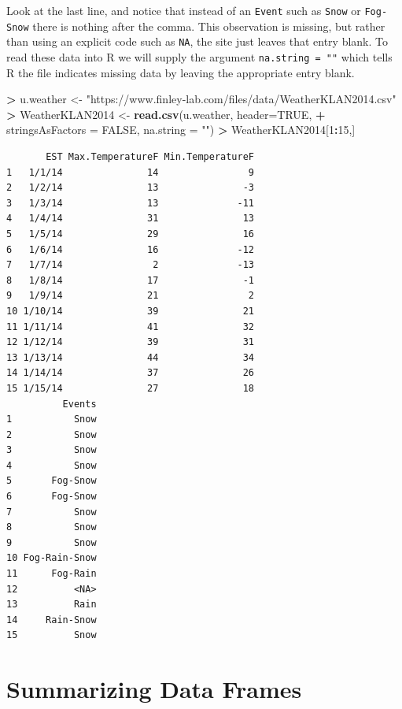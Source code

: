 \documentclass[
]{krantz}
\makeatletter
\newenvironment{Shaded}{\begin{snugshade}}{\end{snugshade}}
\newcommand{\DataTypeTok}[1]{\textcolor[rgb]{0.27,0.27,0.27}{#1}}
\newcommand{\DecValTok}[1]{\textcolor[rgb]{0.06,0.06,0.06}{#1}}
\newcommand{\KeywordTok}[1]{\textcolor[rgb]{0.27,0.27,0.27}{\textbf{#1}}}
\newcommand{\NormalTok}[1]{#1}
\newcommand{\OperatorTok}[1]{\textcolor[rgb]{0.43,0.43,0.43}{\textbf{#1}}}
\newcommand{\OtherTok}[1]{\textcolor[rgb]{0.37,0.37,0.37}{#1}}
\newcommand{\StringTok}[1]{\textcolor[rgb]{0.5,0.5,0.5}{#1}}
\newenvironment{kframe}{%
\medskip{}
\setlength{\fboxsep}{.8em}
 \def\at@end@of@kframe{}%
 \ifinner\ifhmode%
  \def\at@end@of@kframe{\end{minipage}}%
  \begin{minipage}{\columnwidth}%
 \fi\fi%
 \def\FrameCommand##1{\hskip\@totalleftmargin \hskip-\fboxsep
 \colorbox{shadecolor}{##1}\hskip-\fboxsep
     \hskip-\linewidth \hskip-\@totalleftmargin \hskip\columnwidth}%
 \MakeFramed {\advance\hsize-\width
   \@totalleftmargin\z@ \linewidth\hsize
   \@setminipage}}%
 {\par\unskip\endMakeFramed%
 \at@end@of@kframe}
\renewenvironment{Shaded}{\begin{kframe}}{\end{kframe}}
\makeatother
\begin{document}
Look at the last line, and notice that instead of an \texttt{Event} such as \texttt{Snow} or \texttt{Fog-Snow} there is nothing after the comma. This observation is missing, but rather than using an explicit code such as \texttt{NA}, the site just leaves that entry blank. To read these data into R we will supply the argument \texttt{na.string\ =\ ""} which tells R the file indicates missing data by leaving the appropriate entry blank.

\begin{Shaded}
\begin{Highlighting}[]
\OperatorTok{\textgreater{}}\StringTok{ }\NormalTok{u.weather \textless{}{-}}\StringTok{ "https://www.finley{-}lab.com/files/data/WeatherKLAN2014.csv"}
\OperatorTok{\textgreater{}}\StringTok{ }\NormalTok{WeatherKLAN2014 \textless{}{-}}\StringTok{ }\KeywordTok{read.csv}\NormalTok{(u.weather, }\DataTypeTok{header=}\OtherTok{TRUE}\NormalTok{, }
\OperatorTok{+}\StringTok{                             }\DataTypeTok{stringsAsFactors =} \OtherTok{FALSE}\NormalTok{, }\DataTypeTok{na.string =} \StringTok{""}\NormalTok{)}
\OperatorTok{\textgreater{}}\StringTok{ }\NormalTok{WeatherKLAN2014[}\DecValTok{1}\OperatorTok{:}\DecValTok{15}\NormalTok{,]}
\end{Highlighting}
\end{Shaded}

\begin{verbatim}
       EST Max.TemperatureF Min.TemperatureF
1   1/1/14               14                9
2   1/2/14               13               -3
3   1/3/14               13              -11
4   1/4/14               31               13
5   1/5/14               29               16
6   1/6/14               16              -12
7   1/7/14                2              -13
8   1/8/14               17               -1
9   1/9/14               21                2
10 1/10/14               39               21
11 1/11/14               41               32
12 1/12/14               39               31
13 1/13/14               44               34
14 1/14/14               37               26
15 1/15/14               27               18
          Events
1           Snow
2           Snow
3           Snow
4           Snow
5       Fog-Snow
6       Fog-Snow
7           Snow
8           Snow
9           Snow
10 Fog-Rain-Snow
11      Fog-Rain
12          <NA>
13          Rain
14     Rain-Snow
15          Snow
\end{verbatim}

\hypertarget{summarizing-data-frames}{%
\section{Summarizing Data Frames}\label{summarizing-data-frames}}
\end{document}
